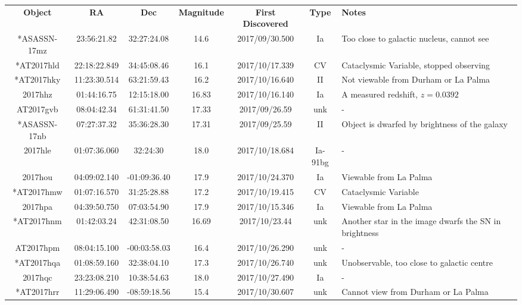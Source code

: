 \documentclass[twocolumn]{revtex4}
\begin{document}
{\renewcommand{\arraystretch}{1.2}%
\begin{table}[h!]
\centering    
\begin{tabularx}{\textwidth}{c c c c @{\hskip 5pt} c c X}
    \hline
    \textbf{Object} & \textbf{RA} & \textbf{Dec} & \textbf{Magnitude} &\textbf{First Discovered} &\textbf{Type} & \textbf{Notes} \\ 
    *ASASSN-17mz & 23:56:21.82 & 32:27:24.08 & 14.6 & 2017/09/30.500 & Ia & {Too close to galactic nucleus, cannot see}  \\
    *AT2017hld & 22:18:22.849 & 34:45:08.46 & 16.1 & 2017/10/17.339 & CV & {Cataclysmic Variable, stopped observing}  \\
    *AT2017hky & 11:23:30.514 & 63:21:59.43 & 16.2 & 2017/10/16.640 & II & {Not viewable from Durham or La Palma}  \\
    2017hhz & 01:44:16.75 & 12:15:18.00 & 16.83 & 2017/10/16.140 & Ia & {A measured redshift, $z=0.0392$}  \\
    AT2017gvb & 08:04:42.34 & 61:31:41.50 & 17.33 & 2017/09/26.59 & unk & {-}  \\
    *ASASSN-17nb & 07:27:37.32 & 35:36:28.30 & 17.31 & 2017/09/25.59 & II & {Object is dwarfed by brightness of the galaxy}  \\
    2017hle & 01:07:36.060 & 32:24:30 & 18.0 & 2017/10/18.684 & Ia-91bg & {-}  \\
    2017hou & 04:09:02.140 & -01:09:36.40 & 17.9 & 2017/10/24.370 &Ia & {Viewable from La Palma}  \\
    *AT2017hmw & 01:07:16.570 & 31:25:28.88 & 17.2 & 2017/10/19.415 & CV & {Cataclysmic Variable}  \\
    2017hpa & 04:39:50.750 & 07:03:54.90 & 17.9 & 2017/10/15.346 & Ia & {Viewable from La Palma}  \\
    *AT2017hnm & 01:42:03.24 & 42:31:08.50 & 16.69 & 2017/10/23.44 & unk & {Another star in the image dwarfs the SN in brightness}  \\
    AT2017hpm & 08:04:15.100 & -00:03:58.03 & 16.4 & 2017/10/26.290 & unk & {-}  \\
    *AT2017hqa & 01:08:59.160 & 32:38:04.10 & 17.3 & 2017/10/26.740 & unk & {Unobservable, too close to galactic centre}  \\
    2017hqc & 23:23:08.210 & 10:38:54.63 & 18.0 & 2017/10/27.490 & Ia & {-}  \\
    *AT2017hrr & 11:29:06.490 & -08:59:18.56 & 15.4 & 2017/10/30.607 & unk & {Cannot view from Durham or La Palma}  \\

\end{tabularx}
\end{table}}
\end{document}
